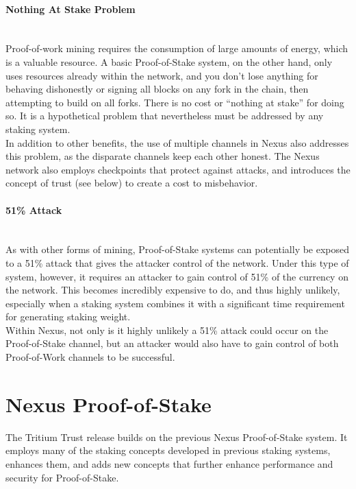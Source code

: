 \documentclass[11pt]{article}
\begin{document}
\paragraph{Nothing At Stake Problem} ~\\
Proof-of-work mining requires the consumption of large amounts of energy, which is a valuable resource. A basic Proof-of-Stake system, on the other hand, only uses resources already within the network, and you don’t lose anything for behaving dishonestly or signing all blocks on any fork in the chain, then attempting to build on all forks. There is no cost or “nothing at stake” for doing so. It is a hypothetical problem that nevertheless must be addressed by any staking system.\\

\noindent In addition to other benefits, the use of multiple channels in Nexus also addresses this problem, as the disparate channels keep each other honest. The Nexus network also employs checkpoints that protect against attacks, and introduces the concept of trust (see below) to create a cost to misbehavior. 

\paragraph{51\% Attack} ~\\
As with other forms of mining, Proof-of-Stake systems can potentially be exposed to a 51\% attack that gives the attacker control of the network. Under this type of system, however, it requires an attacker to gain control of 51\% of the currency on the network. This becomes incredibly expensive to do, and thus highly unlikely, especially when a staking system combines it with a significant time requirement for generating staking weight.\\

\noindent Within Nexus, not only is it highly unlikely a 51\% attack could occur on the Proof-of-Stake channel, but an attacker would also have to gain control of both Proof-of-Work channels to be successful. \\

\bigskip

\section{Nexus Proof-of-Stake}
The Tritium Trust release builds on the previous Nexus Proof-of-Stake system. It employs many of the staking concepts developed in previous staking systems, enhances them, and adds new concepts that further enhance performance and security for Proof-of-Stake.\\
\end{document}
